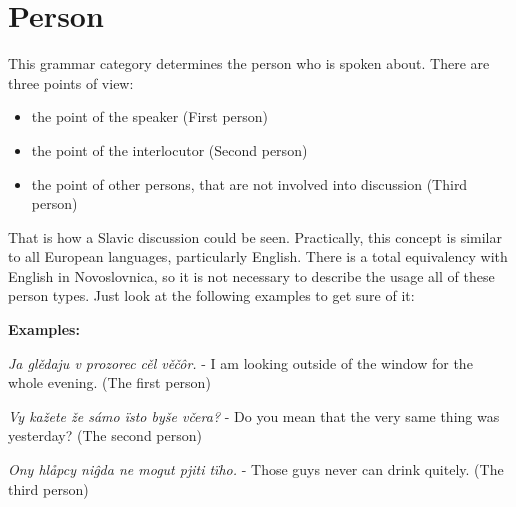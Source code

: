 \section{Person}

This grammar category determines the person who is spoken about. There are three points of view:

\begin{itemize}
	\item the point of the speaker (First person)
	\item the point of the interlocutor (Second person)
	\item the point of other persons, that are not involved into discussion (Third person)
\end{itemize}

That is how a Slavic discussion could be seen. Practically, this concept is similar to all European languages, particularly English. There is a total equivalency with English in Novoslovnica, so it is not necessary to describe the usage all of these person types. Just look at the following examples to get sure of it:

\textbf{Examples:}

\textit{Ja glědaju v prozorec cěl věčôr.} - I am looking outside of the window for the whole evening. (The first person)

\textit{Vy kažete že sámo ïsto byše včera? }- Do you mean that the very same thing was yesterday? (The second person)

\textit{Ony hlåpcy niĝda ne mogut pjiti tïho.} - Those guys never can drink quitely. (The third person)
